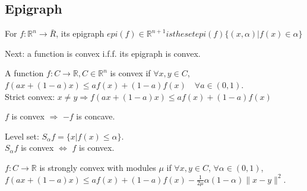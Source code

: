 \documentclass[11pt,fleqn]{book} %
\def\R{\mathbb{R}}
\begin{document}
\subsection{Epigraph} 
\begin{definition}[Epigraph]
For $f: \R^n \rightarrow \bar{R}$, its epigraph $epi(f) \in \R^{n+1} is the set epi(f) \{ (x,\alpha) | f(x) \in \alpha \}$
\end{definition}
Next: a function is convex i.f.f. its epigraph is convex.

\begin{definition}
A function $f : C \rightarrow \R, C \in \R^n$ is convex if $\forall x, y \in C$, $f(ax + (1-a)x) \le af(x) + (1-a)f(x) \quad \forall a \in (0,1)$.\\ 
Strict convex: $x \neq y \Rightarrow f(ax + (1-a)x) \le af(x) + (1-a)f(x) $
\end{definition}
\begin{remark}
$f$ is convex $\Rightarrow$ $-f$ is concave.
\end{remark}
Level set: $S_{\alpha}f = \{ x | f(x) \le \alpha \}$.\\ 
$S_{\alpha}f$ is convex $\Leftrightarrow$ $f$ is convex. \\
\begin{definition}
$f : C \rightarrow \R$ is strongly convex with modules $\mu$ if $\forall x, y \in C$, $\forall \alpha \in (0,1)$, $f(ax + (1-a)x) \le af(x) + (1-a)f(x) - \frac{1}{2\mu}\alpha(1- \alpha) \|x-y\|^2$.
\end{definition}
\end{document}
